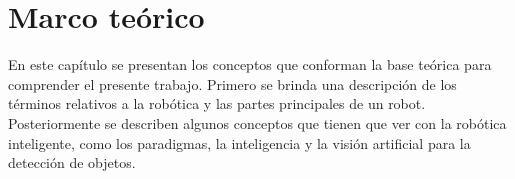 \chapter{Marco teórico} \label{chap:marco_teorico}
\vspace{5 mm}
En este capítulo se presentan los conceptos que conforman la base teórica para comprender el presente trabajo. Primero se brinda una descripción de los términos relativos a la robótica y las partes principales de un robot. Posteriormente se describen algunos conceptos que tienen que ver con la robótica inteligente, como los paradigmas, la inteligencia y la visión artificial para la detección de objetos. 
